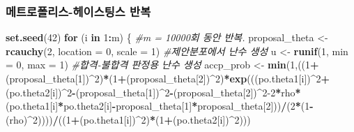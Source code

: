 \documentclass[
]{article}
\newenvironment{Shaded}{\begin{snugshade}}{\end{snugshade}}
\newcommand{\AttributeTok}[1]{\textcolor[rgb]{0.13,0.29,0.53}{#1}}
\newcommand{\CommentTok}[1]{\textcolor[rgb]{0.56,0.35,0.01}{\textit{#1}}}
\newcommand{\ControlFlowTok}[1]{\textcolor[rgb]{0.13,0.29,0.53}{\textbf{#1}}}
\newcommand{\DecValTok}[1]{\textcolor[rgb]{0.00,0.00,0.81}{#1}}
\newcommand{\FunctionTok}[1]{\textcolor[rgb]{0.13,0.29,0.53}{\textbf{#1}}}
\newcommand{\NormalTok}[1]{#1}
\newcommand{\OtherTok}[1]{\textcolor[rgb]{0.56,0.35,0.01}{#1}}
\newcommand{\SpecialCharTok}[1]{\textcolor[rgb]{0.81,0.36,0.00}{\textbf{#1}}}
\begin{document}
\subsubsection{메트로폴리스-헤이스팅스
반복}\label{uxba54uxd2b8uxb85cuxd3f4uxb9acuxc2a4-uxd5e4uxc774uxc2a4uxd305uxc2a4-uxbc18uxbcf5}

\begin{Shaded}
\begin{Highlighting}[]
\FunctionTok{set.seed}\NormalTok{(}\DecValTok{42}\NormalTok{)}
\ControlFlowTok{for}\NormalTok{ (i }\ControlFlowTok{in} \DecValTok{1}\SpecialCharTok{:}\NormalTok{m) \{ }\CommentTok{\#m = 10000회 동안 반복.}
\NormalTok{  proposal\_theta }\OtherTok{\textless{}{-}} \FunctionTok{rcauchy}\NormalTok{(}\DecValTok{2}\NormalTok{, }\AttributeTok{location =} \DecValTok{0}\NormalTok{, }\AttributeTok{scale =} \DecValTok{1}\NormalTok{) }\CommentTok{\#제안분포에서 난수 생성}
\NormalTok{  u }\OtherTok{\textless{}{-}} \FunctionTok{runif}\NormalTok{(}\DecValTok{1}\NormalTok{, }\AttributeTok{min =} \DecValTok{0}\NormalTok{, }\AttributeTok{max =} \DecValTok{1}\NormalTok{) }\CommentTok{\#합격{-}불합격 판정용 난수 생성}
\NormalTok{  accp\_prob }\OtherTok{\textless{}{-}} \FunctionTok{min}\NormalTok{(}\DecValTok{1}\NormalTok{,((}\DecValTok{1}\SpecialCharTok{+}\NormalTok{(proposal\_theta[}\DecValTok{1}\NormalTok{])}\SpecialCharTok{\^{}}\DecValTok{2}\NormalTok{)}\SpecialCharTok{*}\NormalTok{(}\DecValTok{1}\SpecialCharTok{+}\NormalTok{(proposal\_theta[}\DecValTok{2}\NormalTok{])}\SpecialCharTok{\^{}}\DecValTok{2}\NormalTok{)}\SpecialCharTok{*}\FunctionTok{exp}\NormalTok{(((po.theta1[i])}\SpecialCharTok{\^{}}\DecValTok{2}\SpecialCharTok{+}\NormalTok{(po.theta2[i])}\SpecialCharTok{\^{}}\DecValTok{2}\SpecialCharTok{{-}}\NormalTok{(proposal\_theta[}\DecValTok{1}\NormalTok{])}\SpecialCharTok{\^{}}\DecValTok{2}\SpecialCharTok{{-}}\NormalTok{(proposal\_theta[}\DecValTok{2}\NormalTok{])}\SpecialCharTok{\^{}}\DecValTok{2{-}2}\SpecialCharTok{*}\NormalTok{rho}\SpecialCharTok{*}\NormalTok{(po.theta1[i]}\SpecialCharTok{*}\NormalTok{po.theta2[i]}\SpecialCharTok{{-}}\NormalTok{proposal\_theta[}\DecValTok{1}\NormalTok{]}\SpecialCharTok{*}\NormalTok{proposal\_theta[}\DecValTok{2}\NormalTok{]))}\SpecialCharTok{/}\NormalTok{(}\DecValTok{2}\SpecialCharTok{*}\NormalTok{(}\DecValTok{1}\SpecialCharTok{{-}}\NormalTok{(rho)}\SpecialCharTok{\^{}}\DecValTok{2}\NormalTok{))))}\SpecialCharTok{/}\NormalTok{((}\DecValTok{1}\SpecialCharTok{+}\NormalTok{(po.theta1[i])}\SpecialCharTok{\^{}}\DecValTok{2}\NormalTok{)}\SpecialCharTok{*}\NormalTok{(}\DecValTok{1}\SpecialCharTok{+}\NormalTok{(po.theta2[i])}\SpecialCharTok{\^{}}\DecValTok{2}\NormalTok{)))}

\end{Highlighting}
\end{Shaded}
\end{document}
